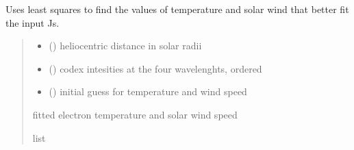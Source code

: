 \documentclass[letterpaper,10pt,english]{sphinxmanual}
\begin{document}
\begin{fulllineitems}
\label{\detokenize{doppler_dimming_lib:doppler_dimming_lib.codex.get_T_W_from_codex}}
\pysigstartsignatures
{}
\pysigstopsignatures
\sphinxAtStartPar
Uses least squares to find the values of temperature and solar wind that better fit the input Js.
\begin{quote}\begin{description}
\begin{itemize}
\item {} 
\sphinxAtStartPar
{} () \textendash{} heliocentric distance in solar radii

\item {} 
\sphinxAtStartPar
{} () \textendash{} codex intesities at the four wavelenghts, ordered

\item {} 
\sphinxAtStartPar
{} () \textendash{} initial guess for temperature and wind speed

\end{itemize}

\sphinxAtStartPar
fitted electron temperature and solar wind speed

\sphinxAtStartPar
list

\end{description}\end{quote}

\end{fulllineitems}

\end{document}
